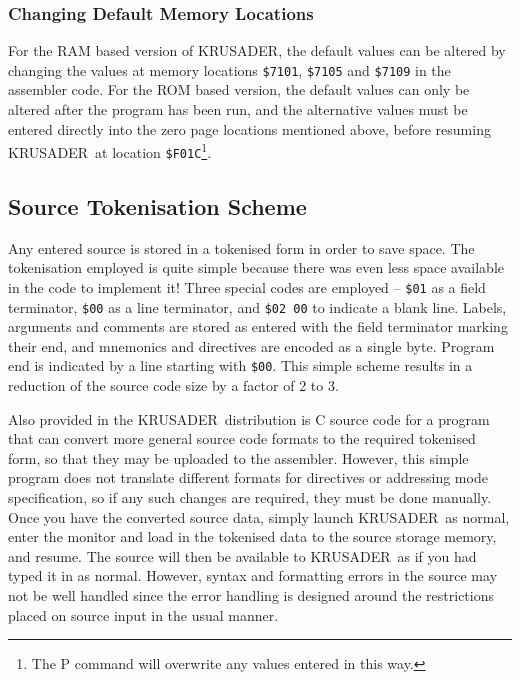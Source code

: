 \documentclass[12pt]{article}
\newcommand{\replica}[1]{\textsf{#1}}
\newcommand{\krusader}{\textsf{KRUSADER}}
\begin{document}
\subsubsection{Changing Default Memory Locations}
\label{sec:mem_defaults}
For the RAM based version of \krusader, the default values can be altered by changing the values at memory locations \texttt{\$7101}, \texttt{\$7105} and \texttt{\$7109} in the assembler code.
For the ROM based version, the default values can only be altered after the program has been run, and the alternative values must be entered directly into the zero page locations mentioned above, before resuming \krusader\ at location 
\texttt{\$F01C}\footnote{The \replica{P} command will overwrite any values entered in this way.}.

\subsection{Source Tokenisation Scheme}
\label{sec:token}

Any entered source is stored in a tokenised form in order to save space.  The tokenisation
employed is quite simple because there was even less space available in the code to implement it!
Three special codes are employed -- \texttt{\$01} as a field terminator, 
\texttt{\$00} as a line terminator, and \texttt{\$02 00} to indicate a blank line.
Labels, arguments and comments are stored as entered with the field terminator marking their end, 
and mnemonics and directives are encoded as a single byte.  Program end is indicated by a line
starting with \texttt{\$00}.  
This simple scheme results in a reduction of the source code size by a factor of 2 to 3.

Also provided in the \krusader\ distribution is C source code for a program that can
convert more general source code formats to the required tokenised form, so that they
may be uploaded to the assembler.  
However, this simple program does not translate
different formats for directives or addressing mode specification, so if any
such changes are required, they must be done manually. 
Once you have the converted source data, simply 
launch \krusader\ as normal, enter the monitor and load in the tokenised data to the
source storage memory, and resume.  The source will then be available to \krusader\
as if you had typed it in as normal.  However, syntax and formatting errors in the source may not be well handled
since the error handling is designed around the restrictions placed on source input in the
usual manner.
\end{document}
